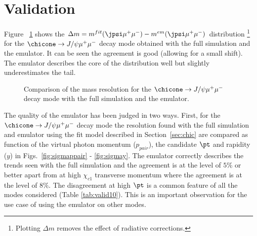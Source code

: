 \section{Validation}
\label{sec:validation}
%
Figure ~\ref{fig:mplot} shows the $\Delta m= m^{fit}(\jpsi \mu^+ \mu^-)
- m^{em}(\jpsi \mu^+ \mu^-)$ distribution \footnote{Plotting $\Delta m$
  removes the effect of radiative corrections.   } for the $\chicone
\rightarrow J/\psi \mu^+ \mu^-$  decay mode obtained with the full
simulation and the emulator. It can be seen the agreement  is good
(allowing for a small shift). The emulator describes the core of the
distribution well but slightly underestimates the tail.
%
%
\begin{figure}[htb!]
\begin{center}
\caption{\small  Comparison of the mass resolution for the  $\chicone
\rightarrow J/\psi \mu^+ \mu^-$  decay mode with the full simulation
and the emulator. }
\label{fig:mplot}
\end{center}
\end{figure}

The quality of the emulator has been judged in two ways. First, for
the 
$\chicone \rightarrow J/\psi \mu^+ \mu^-$  decay mode the resolution
found with the full simulation and emulator using the fit model
described in Section~\ref{sec:chic} are compared as function
of the virtual photon momentum ($p_{pair}$), the candidate $\pt$ and
rapidity ($y$) in Figs.~\ref{fig:sigmappair} - \ref{fig:sigmay}. The
emulator correctly describes the trends seen with the full simulation
and the agreement is at the level of $5 \%$ or better apart from at high
$\chi_{c1}$ transverse momentum where the agreement is at the level of
$8 \%$. The disagreement at high $\pt$ is a common feature of all the
modes considered (Table \ref{tab:valid10}). This is an important
observation for the use case of using the emulator on other modes. 

